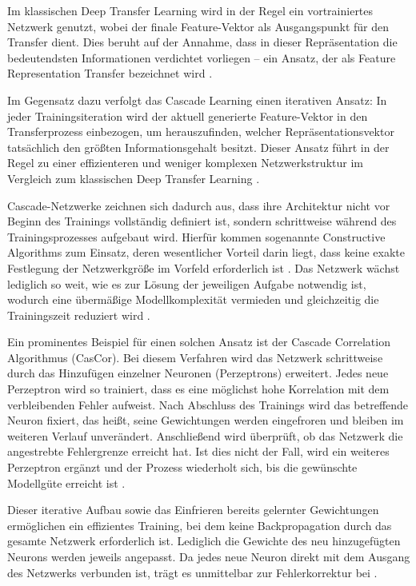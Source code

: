 Im klassischen Deep Transfer Learning wird in der Regel ein vortrainiertes Netzwerk genutzt, wobei der finale Feature-Vektor als Ausgangspunkt 
für den Transfer dient. Dies beruht auf der Annahme, dass in dieser Repräsentation die bedeutendsten Informationen verdichtet vorliegen – ein 
Ansatz, der als Feature Representation Transfer bezeichnet wird \cite{survey_transfer}.

Im Gegensatz dazu verfolgt das Cascade Learning einen iterativen Ansatz: In jeder Trainingsiteration wird der aktuell generierte Feature-Vektor 
in den Transferprozess einbezogen, um herauszufinden, welcher Repräsentationsvektor tatsächlich den größten Informationsgehalt besitzt. Dieser 
Ansatz führt in der Regel zu einer effizienteren und weniger komplexen Netzwerkstruktur im Vergleich zum klassischen Deep Transfer Learning 
\cite{phd_deep_cascade}.

Cascade-Netzwerke zeichnen sich dadurch aus, dass ihre Architektur nicht vor Beginn des Trainings vollständig definiert ist, sondern 
schrittweise während des Trainingsprozesses aufgebaut wird. Hierfür kommen sogenannte Constructive Algorithms zum Einsatz, deren wesentlicher 
Vorteil darin liegt, dass keine exakte Festlegung der Netzwerkgröße im Vorfeld erforderlich ist \cite{Constructive_Cascade}. Das Netzwerk wächst 
lediglich so weit, wie es zur Lösung der jeweiligen Aufgabe notwendig ist, wodurch eine übermäßige Modellkomplexität vermieden und gleichzeitig 
die Trainingszeit reduziert wird \cite{Constructive_Cascade, cascor}.

Ein prominentes Beispiel für einen solchen Ansatz ist der Cascade Correlation Algorithmus (CasCor). Bei diesem Verfahren wird das Netzwerk schrittweise 
durch das Hinzufügen einzelner Neuronen (Perzeptrons) erweitert. Jedes neue Perzeptron wird so trainiert, dass es eine möglichst hohe 
Korrelation mit dem verbleibenden Fehler aufweist. Nach Abschluss des Trainings wird das betreffende Neuron fixiert, das heißt, seine 
Gewichtungen werden eingefroren und bleiben im weiteren Verlauf unverändert. Anschließend wird überprüft, ob das Netzwerk die angestrebte 
Fehlergrenze erreicht hat. Ist dies nicht der Fall, wird ein weiteres Perzeptron ergänzt und der Prozess wiederholt sich, bis die gewünschte 
Modellgüte erreicht ist \cite{cascor}.

Dieser iterative Aufbau sowie das Einfrieren bereits gelernter Gewichtungen ermöglichen ein effizientes Training, bei dem keine Backpropagation 
durch das gesamte Netzwerk erforderlich ist. Lediglich die Gewichte des neu hinzugefügten Neurons werden jeweils angepasst. Da jedes neue 
Neuron direkt mit dem Ausgang des Netzwerks verbunden ist, trägt es unmittelbar zur Fehlerkorrektur bei \cite{cascor}.

